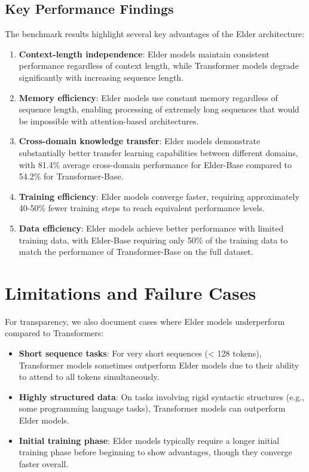 \subsection{Key Performance Findings}

The benchmark results highlight several key advantages of the Elder architecture:

\begin{enumerate}
    \item \textbf{Context-length independence}: Elder models maintain consistent performance regardless of context length, while Transformer models degrade significantly with increasing sequence length.
    
    \item \textbf{Memory efficiency}: Elder models use constant memory regardless of sequence length, enabling processing of extremely long sequences that would be impossible with attention-based architectures.
    
    \item \textbf{Cross-domain knowledge transfer}: Elder models demonstrate substantially better transfer learning capabilities between different domains, with 81.4\% average cross-domain performance for Elder-Base compared to 54.2\% for Transformer-Base.
    
    \item \textbf{Training efficiency}: Elder models converge faster, requiring approximately 40-50\% fewer training steps to reach equivalent performance levels.
    
    \item \textbf{Data efficiency}: Elder models achieve better performance with limited training data, with Elder-Base requiring only 50\% of the training data to match the performance of Transformer-Base on the full dataset.
\end{enumerate}

\section{Limitations and Failure Cases}

For transparency, we also document cases where Elder models underperform compared to Transformers:

\begin{itemize}
    \item \textbf{Short sequence tasks}: For very short sequences (< 128 tokens), Transformer models sometimes outperform Elder models due to their ability to attend to all tokens simultaneously.
    
    \item \textbf{Highly structured data}: On tasks involving rigid syntactic structures (e.g., some programming language tasks), Transformer models can outperform Elder models.
    
    \item \textbf{Initial training phase}: Elder models typically require a longer initial training phase before beginning to show advantages, though they converge faster overall.
\end{itemize}

